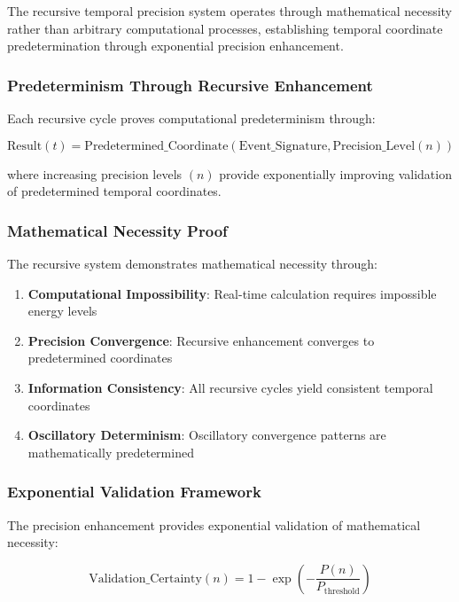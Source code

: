 \documentclass[11pt]{article}
\theoremstyle{remark}
\begin{document}
The recursive temporal precision system operates through mathematical necessity rather than arbitrary computational processes, establishing temporal coordinate predetermination through exponential precision enhancement.

\subsubsection{Predeterminism Through Recursive Enhancement}

Each recursive cycle proves computational predeterminism through:

\begin{equation}
\text{Result}(t) = \text{Predetermined\_Coordinate}(\text{Event\_Signature}, \text{Precision\_Level}(n))
\end{equation}

where increasing precision levels $(n)$ provide exponentially improving validation of predetermined temporal coordinates.

\subsubsection{Mathematical Necessity Proof}

The recursive system demonstrates mathematical necessity through:

\begin{enumerate}
\item \textbf{Computational Impossibility}: Real-time calculation requires impossible energy levels
\item \textbf{Precision Convergence}: Recursive enhancement converges to predetermined coordinates
\item \textbf{Information Consistency}: All recursive cycles yield consistent temporal coordinates
\item \textbf{Oscillatory Determinism}: Oscillatory convergence patterns are mathematically predetermined
\end{enumerate}

\subsubsection{Exponential Validation Framework}

The precision enhancement provides exponential validation of mathematical necessity:

\begin{equation}
\text{Validation\_Certainty}(n) = 1 - \exp\left(-\frac{P(n)}{P_{\text{threshold}}}\right)
\end{equation}
\end{document}
